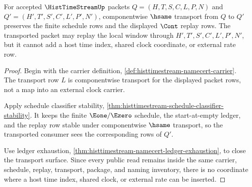\begin{theorem}
\label{thm:hist-time-stream-transport-lock}
For accepted $\HistTimeStreamUp$ packets $Q=(H,T,S,C,L,P,N)$ and $Q'=(H',T',S',C',L',P',N')$, componentwise $\hsame$ transport from $Q$ to $Q'$ preserves the finite schedule rows and the displayed $\Cont$ replay rows. The transported packet may replay the local window through $H',T',S',C',L',P',N'$, but it cannot add a host time index, shared clock coordinate, or external rate row.
\end{theorem}
\begin{proof}
Begin with the carrier definition, \autoref{def:histtimestream-namecert-carrier}. The transport row $L$ is componentwise transport for the displayed packet rows, not a map into an external clock carrier.

Apply schedule classifier stability, \autoref{thm:histtimestream-schedule-classifier-stability}. It keeps the finite $\Eone/\Ezero$ schedule, the start-at-empty ledger, and the replay row stable under componentwise $\hsame$ transport, so the transported consumer sees the corresponding rows of $Q'$.

Use ledger exhaustion, \autoref{thm:histtimestream-namecert-ledger-exhaustion}, to close the transport surface. Since every public read remains inside the same carrier, schedule, replay, transport, package, and naming inventory, there is no coordinate where a host time index, shared clock, or external rate can be inserted.
\end{proof}

